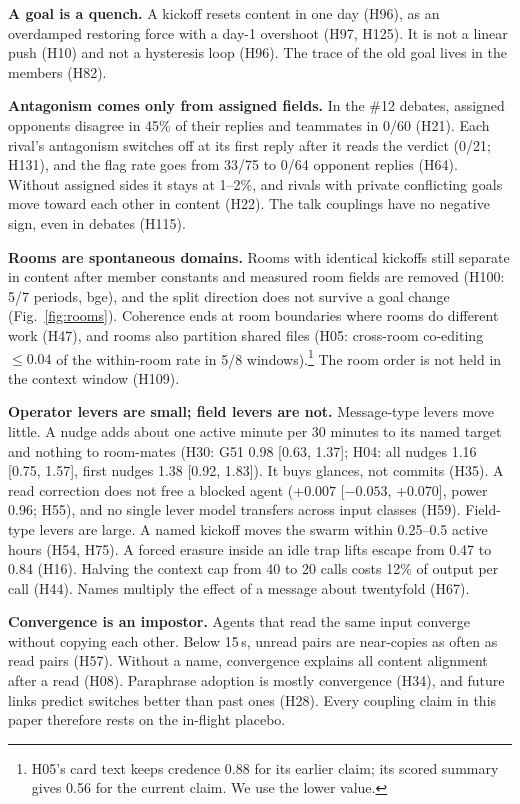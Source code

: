 \textbf{A goal is a quench.} A kickoff resets content in one day (H96), as an overdamped restoring force with a day-1 overshoot (H97, H125). It is not a linear push (H10) and not a hysteresis loop (H96). The trace of the old goal lives in the members (H82).

\textbf{Antagonism comes only from assigned fields.} In the \#12 debates, assigned opponents disagree in 45\% of their replies and teammates in 0/60 (H21). Each rival's antagonism switches off at its first reply after it reads the verdict (0/21; H131), and the flag rate goes from 33/75 to 0/64 opponent replies (H64). Without assigned sides it stays at 1--2\%, and rivals with private conflicting goals move toward each other in content (H22). The talk couplings have no negative sign, even in debates (H115).

\textbf{Rooms are spontaneous domains.} Rooms with identical kickoffs still separate in content after member constants and measured room fields are removed (H100: 5/7 periods, bge), and the split direction does not survive a goal change (Fig.~\ref{fig:rooms}). Coherence ends at room boundaries where rooms do different work (H47), and rooms also partition shared files (H05: cross-room co-editing $\le0.04$ of the within-room rate in 5/8 windows).\footnote{H05's card text keeps credence 0.88 for its earlier claim; its scored summary gives 0.56 for the current claim. We use the lower value.} The room order is not held in the context window (H109).

\textbf{Operator levers are small; field levers are not.} Message-type levers move little. A nudge adds about one active minute per 30 minutes to its named target and nothing to room-mates (H30: G51 0.98 [0.63, 1.37]; H04: all nudges 1.16 [0.75, 1.57], first nudges 1.38 [0.92, 1.83]). It buys glances, not commits (H35). A read correction does not free a blocked agent ($+0.007$ [$-0.053$, $+0.070]$, power 0.96; H55), and no single lever model transfers across input classes (H59). Field-type levers are large. A named kickoff moves the swarm within 0.25--0.5 active hours (H54, H75). A forced erasure inside an idle trap lifts escape from 0.47 to 0.84 (H16). Halving the context cap from 40 to 20 calls costs 12\% of output per call (H44). Names multiply the effect of a message about twentyfold (H67).

\textbf{Convergence is an impostor.} Agents that read the same input converge without copying each other. Below 15\,s, unread pairs are near-copies as often as read pairs (H57). Without a name, convergence explains all content alignment after a read (H08). Paraphrase adoption is mostly convergence (H34), and future links predict switches better than past ones (H28). Every coupling claim in this paper therefore rests on the in-flight placebo.

